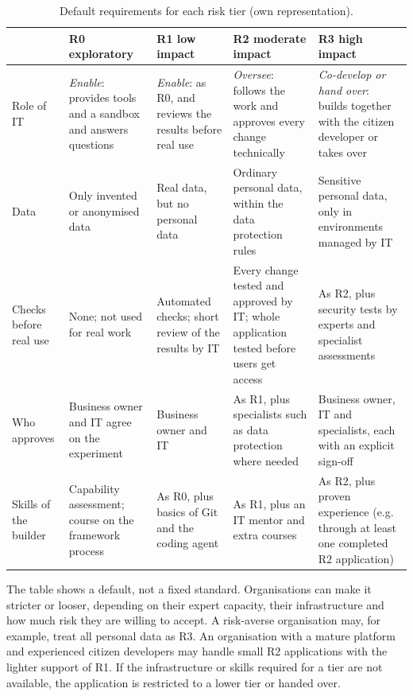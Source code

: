 \documentclass[10pt,a4paper]{article}
\begin{document}
\begin{table}[H]
    \centering
    \small
    \caption{Default requirements for each risk tier (own
    representation).}
    \label{tab:tier-consequences}
    \begin{tabular}{@{}p{2.3cm} p{2.8cm} p{2.8cm} p{2.8cm} p{2.9cm}@{}}
    \toprule
    & \textbf{R0 exploratory} & \textbf{R1 low impact} & \textbf{R2
        moderate impact} & \textbf{R3 high impact} \\
    \midrule
    Role of IT & \emph{Enable}: provides tools and a sandbox and answers
        questions & \emph{Enable}: as R0, and reviews the results before
        real use & \emph{Oversee}: follows the work and approves every
        change technically & \emph{Co-develop or hand over}: builds
        together with the citizen developer or takes over \\
    \addlinespace
    Data & Only invented or anonymised data & Real data, but no personal
        data & Ordinary personal data, within the data protection rules &
        Sensitive personal data, only in environments managed by IT \\
    \addlinespace
    Checks before real use & None; not used for real work & Automated
        checks; short review of the results by IT & Every change tested
        and approved by IT; whole application tested before users get
        access & As R2, plus security tests by experts and specialist
        assessments \\
    \addlinespace
    Who approves & Business owner and IT agree on the experiment &
        Business owner and IT & As R1, plus specialists such as data
        protection where needed & Business owner, IT and specialists, each
        with an explicit sign-off \\
    \addlinespace
    Skills of the builder & Capability assessment; course on the
        framework process & As R0, plus basics of Git and the coding agent
        & As R1, plus an IT mentor and extra courses & As R2, plus proven experience (e.g. through at least one completed R2 application) \\
    \bottomrule
    \end{tabular}
\end{table}

The table shows a default, not a fixed standard. Organisations can make
it stricter or looser, depending on their expert capacity, their
infrastructure and how much risk they are willing to accept. A
risk-averse organisation may, for example, treat all personal data as
R3. An organisation with a mature platform and experienced citizen
developers may handle small R2 applications with the lighter support of
R1. If the infrastructure or skills required for a tier are not
available, the application is restricted to a lower tier or handed over.
\end{document}
